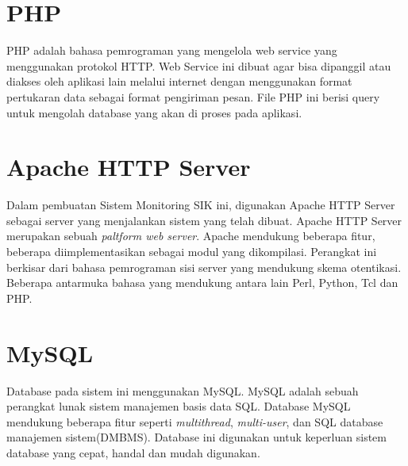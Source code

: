 \section{PHP}
\tab PHP adalah bahasa pemrograman yang mengelola web service yang menggunakan protokol HTTP. Web Service ini dibuat agar bisa dipanggil atau diakses oleh aplikasi lain melalui internet dengan menggunakan format pertukaran data sebagai format pengiriman pesan. File PHP ini berisi query untuk mengolah database yang akan di proses pada aplikasi\cite{PHP}.

\section{Apache HTTP Server}
\tab Dalam pembuatan Sistem Monitoring SIK ini, digunakan Apache HTTP Server sebagai server yang menjalankan sistem yang telah dibuat. Apache HTTP Server merupakan sebuah \textit{paltform web server}. Apache mendukung beberapa fitur, beberapa diimplementasikan sebagai modul yang dikompilasi. Perangkat ini berkisar dari bahasa pemrograman sisi server yang mendukung skema otentikasi. Beberapa antarmuka bahasa yang mendukung antara lain Perl, Python, Tcl dan PHP\cite{apache}.

\section{MySQL }
\tab Database pada sistem ini menggunakan MySQL. MySQL adalah sebuah perangkat lunak sistem manajemen basis data SQL. Database MySQL mendukung beberapa fitur seperti \textit{multithread}, \textit{multi-user}, dan SQL database manajemen sistem(DMBMS). Database ini digunakan untuk keperluan sistem database yang cepat, handal dan mudah digunakan\cite{mysql}.